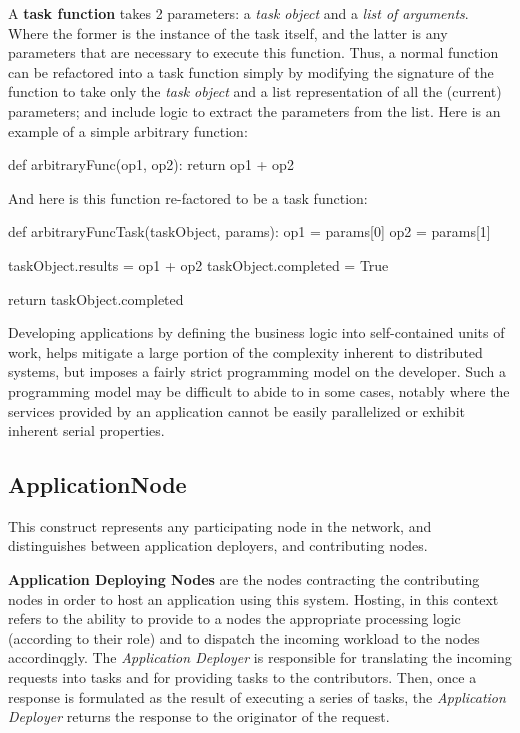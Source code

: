 \documentclass[12pt, titlepage]{uo_temp}
\begin{document}
     A \textbf{task function} takes 2 parameters: a \emph{task object} and a
     \emph{list of arguments}. Where the former is the instance of the task itself, and
     the latter is any parameters that are necessary to execute this function. Thus, a
     normal function can be refactored into a task function simply by modifying the
     signature of the function to take only the \emph{task object} and a list
     representation of all the (current) parameters; and include logic to extract the
     parameters from the list. \clearpage
     Here is an example of a simple arbitrary function:
     \begin{python}
       def arbitraryFunc(op1, op2):
         return op1 + op2
     \end{python}
     And here is this function re-factored to be a task function:
     \begin{python}
       def arbitraryFuncTask(taskObject, params):
         op1 = params[0]
         op2 = params[1]
         
         taskObject.results = op1 + op2
         taskObject.completed = True

         return taskObject.completed
     \end{python}

     Developing applications by defining the business logic into self-contained units of
     work, helps mitigate a large portion of the complexity inherent to distributed
     systems, but imposes a fairly strict programming model on the developer. Such a
     programming model may be difficult to abide to in some cases, notably where the
     services provided by an application cannot be easily parallelized or exhibit inherent
     serial properties.

     \subsection{ApplicationNode}
     This construct represents any participating node in the network,
     and distinguishes between application deployers, and contributing nodes.

     \textbf{Application Deploying Nodes} are the nodes contracting the contributing nodes
     in order to host an application using this system. Hosting, in this context refers to
     the ability to provide to a nodes the appropriate processing logic (according to
     their role) and to dispatch the incoming workload to the nodes accordinqgly. The
     \emph{Application Deployer} is responsible for translating the incoming requests into
     tasks and for providing tasks to the contributors. Then, once a response is
     formulated as the result of executing a series of tasks, the \emph{Application
       Deployer} returns the response to the originator of the request.
\end{document}
